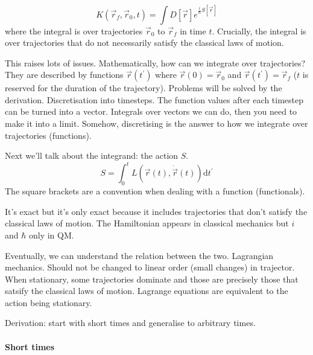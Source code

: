 \documentclass[a4paper]{extarticle}
\newcommand{\tpr}{t^\prime}
\newcommand{\dtpr}{\text{d}t^\prime}
\begin{document}
\begin{equation}
  K(\vec{r}_f, \vec{r}_0, t) = \int D \left[\vec{r}\right] e^{\frac{i}{\hbar} S\left[\vec{r}\right] }
\end{equation}
where the integral is over trajectories $\vec{r}_0$ to $\vec{r}_f$ in time $t$.
Crucially, the integral is over trajectories that do not necessarily satisfy the
classical laws of motion.

This raises lots of issues.
Mathematically, how can we integrate over trajectories?
They are described by functions $\vec{r}(\tpr)$ where $\vec{r}(0) = \vec{r}_0$ and
$\vec{r}(\tpr) = \vec{r}_f$ ($t$ is reserved for the duration of the trajectory).
Problems will be solved by the derivation.
Discretisation into timesteps.
The function values after each timestep can be turned into a vector.
Integrals over vectors we can do, then you need to make it into a limit.
Somehow, discretising is the answer to how we integrate over trajectories (functions).

Next we'll talk about the integrand: the action $S$.
\begin{equation}
  S = \int_0^t L\left(\vec{r}(t), \dot{\vec{r}}(t)\right) \dtpr
\end{equation}
The square brackets are a convention when dealing with a function (functionals).

It's exact but it's only exact because it includes trajectories that don't satisfy
the classical laws of motion.
The Hamiltonian appears in classical mechanics but $i$ and $\hbar$ only in QM.

Eventually, we can understand the relation between the two.
Lagrangian mechanics.
Should not be changed to linear order (small changes) in trajector.
When stationary, some trajectories dominate and those are precisely those that
satsify the classical laws of motion.
Lagrange equations are equivalent to the action being stationary.

Derivation: start with short times and generalise to arbitrary times.

\paragraph{Short times}
\end{document}
